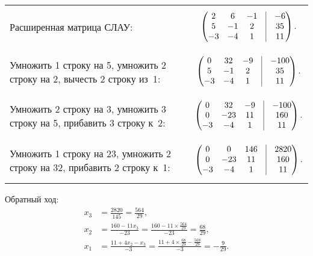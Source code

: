 \documentclass[10pt, a4paper, titlepage]{article}
\begin{document}
\begin{tabular}{m{}m{}}
    Расширенная матрица СЛАУ: &
    \begin{equation*}
        \begin{pmatrix}
            2 & 6 & -1 & \vrule & -6 \\
            5 & -1 & 2 & \vrule & 35 \\
            -3 & -4 & 1 & \vrule & 11
        \end{pmatrix}.
    \end{equation*}
    \\
    Умножить 1 строку на 5, умножить 2 строку на 2, вычесть 2 строку из~1: &
    \begin{equation*}
        \begin{pmatrix}
            0 & 32 & -9 & \vrule & -100 \\
            5 & -1 & 2 & \vrule & 35 \\
            -3 & -4 & 1 & \vrule & 11
        \end{pmatrix}.
    \end{equation*}
    \\
    Умножить 2 строку на 3, умножить 3 строку на 5, прибавить 3 строку к~2: &
    \begin{equation*}
        \begin{pmatrix}
            0 & 32 & -9 & \vrule & -100 \\
            0 & -23 & 11 & \vrule & 160 \\
            -3 & -4 & 1 & \vrule & 11  
        \end{pmatrix}.
    \end{equation*} 
    \\
    Умножить 1 строку на 23, умножить 2 строку на 32, прибавить 2 строку к~1: &
    \begin{equation*}
        \begin{pmatrix}
            0 & 0 & 146 & \vrule & 2820 \\
            0 & -23 & 11 & \vrule & 160 \\
            -3 & -4 & 1 & \vrule & 11
        \end{pmatrix}.
    \end{equation*}
\end{tabular}


Обратный ход:
\begin{align*}
x_3 &= \frac{2820}{145}=\frac{564}{29}, \\
x_2 &= \frac{160-11x_3}{-23}=\frac{160-11\times\frac{564}{29}}{-23}=\frac{68}{29}, \\
x_1 &= \frac{11+4x_2-x_3}{-3}=\frac{11+4\times\frac{68}{29}-\frac{568}{29}}{-3}=-\frac{9}{29}.
\end{align*}
\end{document}
